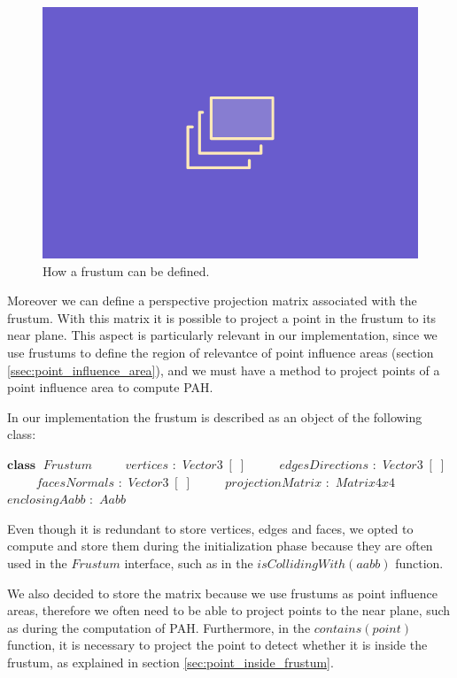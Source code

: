 \documentclass{PoliMi_MasterThesis}
\newcommand*\Class[1]{\State $\textbf{class} \;$ #1}
\newcommand*\Member[2]{\State $\qquad$ #1 $:$ #2}
\begin{document}
\begin{figure}[H]
    \centering
    \includegraphics[width=\textwidth*\real{0.6}]{Images/TODO.png}
    \caption{How a frustum can be defined.}
    \label{fig:frustum}
\end{figure}

Moreover we can define a perspective projection matrix associated with the frustum. With this matrix it is possible to project a point in the frustum to its near plane. This aspect is particularly relevant in our implementation, since we use frustums to define the region of relevantce of point influence areas (section \ref{ssec:point_influence_area}), and we must have a method to project points of a point influence area to compute PAH.

In our implementation the frustum is described as an object of the following class:
\begin{algorithm}[H]
	\begin{algorithmic}
		\Class{$Frustum$}
		\Member{$vertices$}{$Vector3\;[\;]$}
		\Member{$edgesDirections$}{$Vector3\;[\;]$}
		\Member{$facesNormals$}{$Vector3\;[\;]$}
		\Member{$projectionMatrix$}{$Matrix4x4$}
		\Member{$enclosingAabb$}{$Aabb$}
	\end{algorithmic}
\end{algorithm} 

Even though it is redundant to store vertices, edges and faces, we opted to compute and store them during the initialization phase because they are often used in the $Frustum$ interface, such as in the $isCollidingWith(aabb)$ function. 

We also decided to store the matrix because we use frustums as point influence areas, therefore we often need to be able to project points to the near plane, such as during the computation of PAH. Furthermore, in the $contains(point)$ function, it is necessary to project the point to detect whether it is inside the frustum, as explained in section \ref{sec:point_inside_frustum}.
\end{document}
